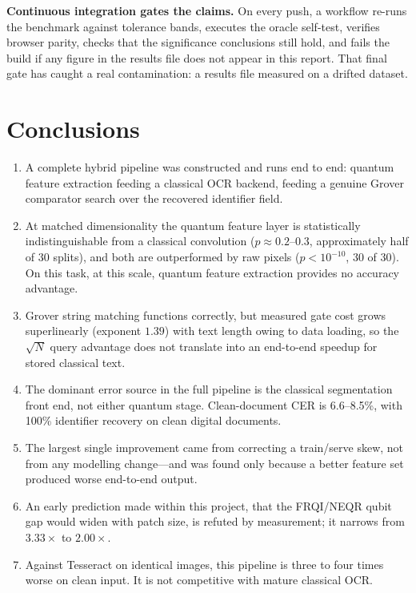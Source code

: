 \documentclass[11pt,a4paper]{article}
\begin{document}
\textbf{Continuous integration gates the claims.} On every push, a workflow
re-runs the benchmark against tolerance bands, executes the oracle self-test,
verifies browser parity, checks that the significance conclusions still hold, and
fails the build if any figure in the results file does not appear in this report.
That final gate has caught a real contamination: a results file measured on a
drifted dataset.

\section{Conclusions}

\begin{enumerate}
\item A complete hybrid pipeline was constructed and runs end to end: quantum
      feature extraction feeding a classical OCR backend, feeding a genuine
      Grover comparator search over the recovered identifier field.

\item At matched dimensionality the quantum feature layer is statistically
      indistinguishable from a classical convolution ($p \approx 0.2$--$0.3$,
      approximately half of 30 splits), and both are outperformed by raw pixels
      ($p<10^{-10}$, 30 of 30). On this task, at this scale, quantum feature
      extraction provides no accuracy advantage.

\item Grover string matching functions correctly, but measured gate cost grows
      superlinearly (exponent $1.39$) with text length owing to data loading, so
      the $\sqrt{N}$ query advantage does not translate into an end-to-end
      speedup for stored classical text.

\item The dominant error source in the full pipeline is the classical
      segmentation front end, not either quantum stage. Clean-document CER is
      6.6--8.5\%, with 100\% identifier recovery on clean digital documents.

\item The largest single improvement came from correcting a train/serve skew,
      not from any modelling change---and was found only because a better
      feature set produced worse end-to-end output.

\item An early prediction made within this project, that the FRQI/NEQR qubit gap
      would widen with patch size, is refuted by measurement; it narrows from
      $3.33\times$ to $2.00\times$.

\item Against Tesseract on identical images, this pipeline is three to four times
      worse on clean input. It is not competitive with mature classical OCR.
\end{enumerate}
\end{document}
